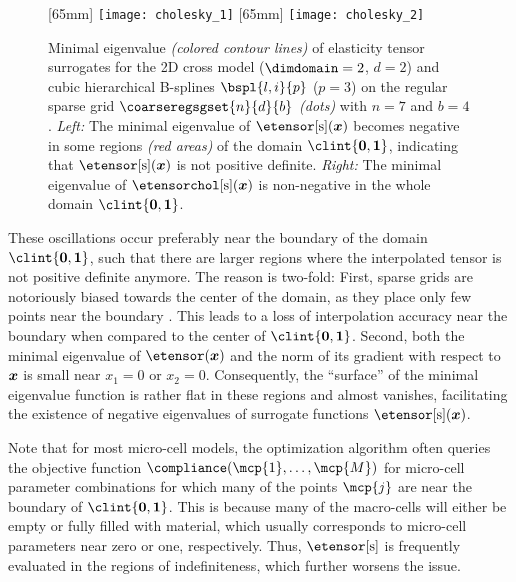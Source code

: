 \begin{figure}
  [65mm]{%
    \texttt{[image: cholesky\_1]}%
  }%
  \hfill%
  [65mm]{%
    \texttt{[image: cholesky\_2]}%
  }%
  \hfill\hfill%
  \caption[%
    Minimal eigenvalue of interpolated elasticity tensors%
  ]{%
    Minimal eigenvalue \emph{(colored contour lines)}
    of elasticity tensor surrogates
    for the 2D cross model ($\dimdomain = 2$, $d = 2$)
    and cubic hierarchical B-splines $\bspl{l,i}{p}$ ($p = 3$) on
    the regular sparse grid $\coarseregsgset{n}{d}{b}$ \emph{(dots)}
    with $n = 7$ and $b = 4$.
    \emph{Left:} The minimal eigenvalue of $\etensorintp(\*x)$
    becomes negative in some regions \emph{\textcolor{C1}{(red areas)}}
    of the domain $\clint{\*0, \*1}$,
    indicating that $\etensorintp(\*x)$ is not positive definite.
    \emph{Right:} The minimal eigenvalue of $\etensorcholintp(\*x)$
    is non-negative in the whole domain $\clint{\*0, \*1}$.%
  }%
  \label{fig:cholesky}%
\end{figure}

These oscillations occur preferably near the boundary of the domain
$\clint{\*0, \*1}$, such that there are larger regions
where the interpolated tensor is not positive definite anymore.
The reason is two-fold:
First, sparse grids are notoriously biased towards the center of the domain,
as they place only few points near the boundary \cite{Pflueger10Spatially}.
This leads to a loss of interpolation accuracy near the boundary
when compared to the center of $\clint{\*0, \*1}$.
Second, both the minimal eigenvalue of $\etensor(\*x)$ and the norm of its
gradient with respect to ${\boldsymbol{x}}$ is small near $x_1 = 0$ or $x_2 = 0$.
Consequently, the ``surface'' of the minimal eigenvalue function
is rather flat in these regions and almost vanishes,
facilitating the existence of negative eigenvalues of
surrogate functions $\etensorintp(\*x)$.

Note that for most micro-cell models,
the optimization algorithm often queries the objective function
$\compliance(\mcp{1}, \dotsc, \mcp{M})$ for micro-cell parameter
combinations for which many of the points $\mcp{j}$ are near the boundary
of $\clint{\*0, \*1}$.
This is because many of the macro-cells will either be empty or
fully filled with material, which usually corresponds to micro-cell
parameters near zero or one, respectively.
Thus, $\etensorintp$ is frequently evaluated in the regions of
indefiniteness, which further worsens the issue.

